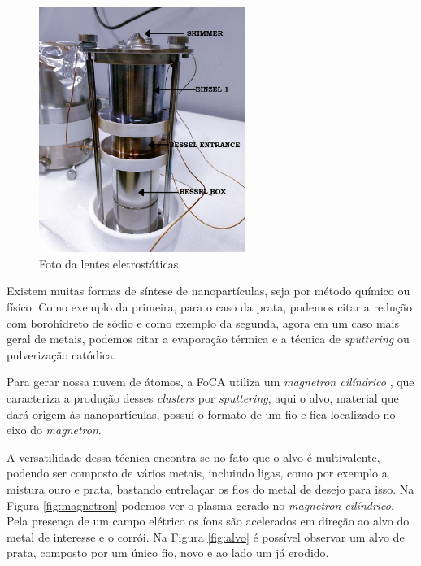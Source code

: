 \begin{figure}
  \centering
  \includegraphics[width=0.6\textwidth]{images/foca/lentes}
  \caption{ Foto da lentes eletrostáticas.  }
  \label{fig:foto_lentes}
\end{figure}



Existem muitas formas de síntese de nanopartículas, seja por método químico ou físico. Como exemplo da primeira, para o caso da prata, podemos citar a redução com borohidreto de sódio e como exemplo da segunda, agora em um caso mais geral de metais, podemos citar a evaporação térmica e a técnica de \textit{sputtering} ou pulverização catódica.

Para gerar nossa nuvem de átomos, a FoCA utiliza um \textit{magnetron cilíndrico} \cite{ref_artigo_foca}, que caracteriza a produção desses \textit{clusters} por \textit{sputtering}, aqui o alvo, material que dará origem às nanopartículas, possuí o formato de um fio e fica localizado no eixo do \textit{magnetron}.

A versatilidade dessa técnica encontra-se no fato que o alvo é multivalente, podendo ser composto de vários metais, incluindo ligas, como por exemplo a mistura ouro e prata, bastando entrelaçar os fios do metal de desejo para isso. Na Figura \ref{fig:magnetron} podemos ver o plasma gerado no \textit{magnetron cilíndrico}. Pela presença de um campo elétrico os íons são acelerados em direção ao alvo do metal de interesse e o corrói. Na Figura \ref{fig:alvo} é possível observar um alvo de prata, composto por um único fio, novo e ao lado um já erodido.

